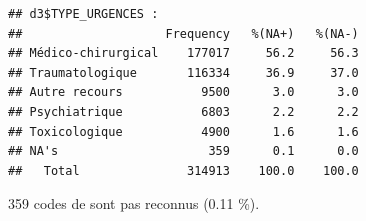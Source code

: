 \documentclass[]{article}
\newenvironment{Shaded}{\begin{snugshade}}{\end{snugshade}}
\newcommand{\KeywordTok}[1]{\textcolor[rgb]{0.13,0.29,0.53}{\textbf{{#1}}}}
\newcommand{\StringTok}[1]{\textcolor[rgb]{0.31,0.60,0.02}{{#1}}}
\newcommand{\NormalTok}[1]{{#1}}
\begin{document}
\begin{verbatim}
## d3$TYPE_URGENCES : 
##                    Frequency   %(NA+)   %(NA-)
## Médico-chirurgical    177017     56.2     56.3
## Traumatologique       116334     36.9     37.0
## Autre recours           9500      3.0      3.0
## Psychiatrique           6803      2.2      2.2
## Toxicologique           4900      1.6      1.6
## NA's                     359      0.1      0.0
##   Total               314913    100.0    100.0
\end{verbatim}

359 codes de sont pas reconnus (0.11 \%).

\begin{Shaded}
\end{Shaded}
\end{document}
